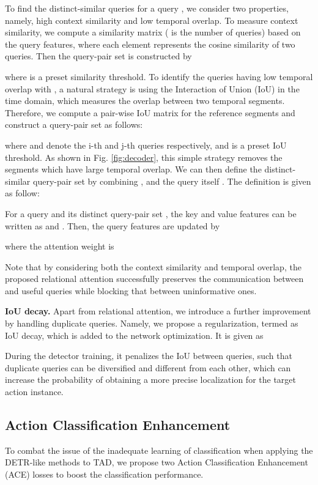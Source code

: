 \documentclass[runningheads]{llncs}
\newcommand{\figref}[1]{Fig. \ref{#1}}
\newcommand{\myPara}[1]{\vspace{.05in}\noindent\textbf{#1}}
\begin{document}
To find the distinct-similar queries for a query , we consider two properties, namely, high context similarity and low temporal overlap.
To measure context similarity, we compute a similarity matrix  ( is the number of queries) based on the query features, where each element represents the cosine similarity of two queries. Then the query-pair set  is constructed by


where  is a preset similarity threshold.
To identify the queries having low temporal overlap with , a natural strategy is using the Interaction of Union (IoU) in the time domain, which measures the overlap between two temporal segments. Therefore, we compute a pair-wise IoU matrix  for the reference segments and construct a query-pair set  as follows:          

where  and  denote the i-th and j-th queries respectively, and  is a preset IoU threshold. As shown in \figref{fig:decoder}, this simple strategy removes the segments which have large temporal overlap. 
We can then define the distinct-similar query-pair set  by combining ,  and the query itself . The definition is given as follow: 






For a query  and its distinct query-pair set , the key and value features can be written as  and . Then, the query features  are updated by


where the attention weight  is

Note that by considering both the context similarity and temporal overlap, the proposed relational attention successfully preserves the communication between  and useful queries while blocking that between uninformative ones. 



\myPara{IoU decay.} 
Apart from relational attention, we introduce a further improvement by handling duplicate queries.
Namely, we propose a regularization, termed as IoU decay, which is added to the network optimization. It is given as   


During the detector training, it penalizes the IoU between queries, such that duplicate queries can be diversified and different from each other, which can increase the probability of obtaining a more precise localization for the target action instance.










\subsection{Action Classification Enhancement} \label{cls_section}
To combat the issue of the inadequate learning of classification when applying the DETR-like methods to TAD, we propose two Action Classification Enhancement (ACE) losses to boost the classification performance. 
\end{document}
